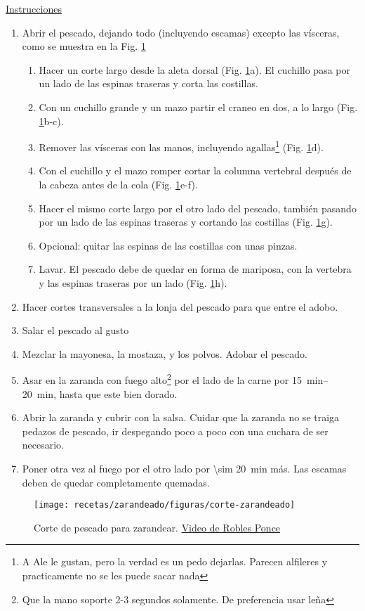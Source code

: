\underline{Instrucciones}
\begin{enumerate}
\item Abrir el pescado, dejando todo (incluyendo escamas) excepto las vísceras, como se muestra en la Fig. \ref{fig:corte-zarandeado}
\begin{enumerate}
\item Hacer un corte largo desde la aleta dorsal (Fig. \ref{fig:corte-zarandeado}a). El cuchillo pasa por un lado de las espinas traseras y corta las costillas.
\item Con un cuchillo grande y un mazo partir el craneo en dos, a lo largo (Fig. \ref{fig:corte-zarandeado}b-c).
\item Remover las vísceras con las manos, incluyendo agallas\footnote{A Ale le gustan, pero la verdad es un pedo dejarlas. Parecen alfileres y practicamente no se les puede sacar nada} (Fig. \ref{fig:corte-zarandeado}d).
\item Con el cuchillo y el mazo romper cortar la columna vertebral después de la cabeza antes de la cola (Fig. \ref{fig:corte-zarandeado}e-f).
\item Hacer el mismo corte largo por el otro lado del pescado, también pasando por un lado de las espinas traseras y cortando las costillas (Fig. \ref{fig:corte-zarandeado}g).
\item Opcional: quitar las espinas de las costillas con unas pinzas.
\item Lavar. El pescado debe de quedar en forma de mariposa, con la vertebra y las espinas traseras por un lado (Fig. \ref{fig:corte-zarandeado}h).
\end{enumerate}
\item Hacer cortes transversales a la lonja del pescado para que entre el adobo.
\item Salar el pescado al gusto
\item Mezclar la mayonesa, la mostaza, y los polvos. Adobar el pescado.
\item Asar en la zaranda con fuego alto\footnote{Que la mano soporte 2-3 segundos solamente. De preferencia usar leña} por el lado de la carne por \SIrange{15}{20}{min}, hasta que este bien dorado.
\item Abrir la zaranda y cubrir con la salsa. Cuidar que la zaranda no se traiga pedazos de pescado, ir despegando poco a poco con una cuchara de ser necesario.
\item Poner otra vez al fuego por el otro lado por \SI{\sim 20}{min} más. Las escamas deben de quedar completamente quemadas.
\end{enumerate}

\begin{figure}
\texttt{[image: recetas/zarandeado/figuras/corte-zarandeado]}
\caption{Corte de pescado para zarandear. \href{https://www.youtube.com/watch?v=_OmdFQWyWRc}{Video de Robles Ponce}}
\label{fig:corte-zarandeado}
\end{figure}